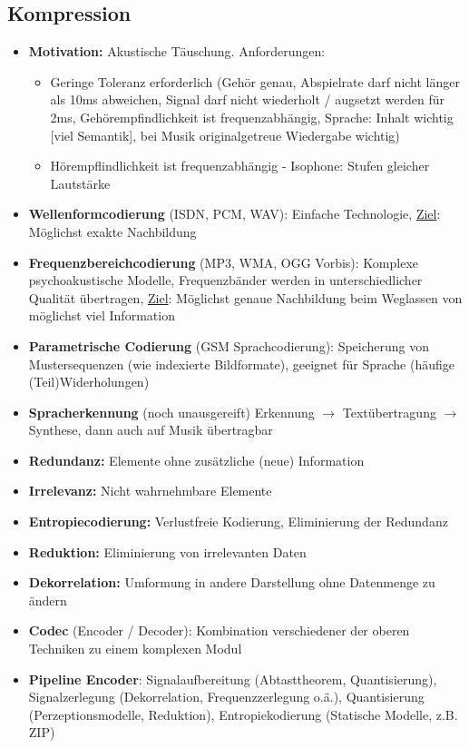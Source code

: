 \documentclass[12pt,landscape]{article}
\begin{document}
\begin{multicols}{3}
\subsection{Kompression}
\begin{itemize}
\item \textbf{Motivation:} Akustische Täuschung. Anforderungen:
\begin{itemize}
\item Geringe Toleranz erforderlich (Gehör genau, Abspielrate darf nicht länger als 10ms abweichen, Signal darf nicht wiederholt / augsetzt werden für 2ms, Gehörempfindlichkeit ist frequenzabhängig, Sprache: Inhalt wichtig [viel Semantik], bei Musik originalgetreue Wiedergabe wichtig)
\item Hörempflindlichkeit ist frequenzabhängig - Isophone: Stufen gleicher Lautstärke
\end{itemize}
\item \textbf{Wellenformcodierung} (ISDN, PCM, WAV): Einfache Technologie, \underline{Ziel}: Möglichst exakte Nachbildung
\item \textbf{Frequenzbereichcodierung} (MP3, WMA, OGG Vorbis): Komplexe psychoakustische Modelle, Frequenzbänder werden in unterschiedlicher Qualität übertragen, \underline{Ziel}: Möglichst genaue Nachbildung beim Weglassen von möglichst viel Information
\item \textbf{Parametrische Codierung} (GSM Sprachcodierung): Speicherung von Mustersequenzen (wie indexierte Bildformate), geeignet für Sprache (häufige (Teil)Widerholungen)
\item \textbf{Spracherkennung} (noch unausgereift) Erkennung $\rightarrow$ Textübertragung $\rightarrow$ Synthese, dann auch auf Musik übertragbar
\item \textbf{Redundanz:} Elemente ohne zusätzliche (neue) Information
\item \textbf{Irrelevanz:} Nicht wahrnehmbare Elemente
\item \textbf{Entropiecodierung:} Verlustfreie Kodierung, Eliminierung der Redundanz
\item \textbf{Reduktion:} Eliminierung von irrelevanten Daten
\item \textbf{Dekorrelation:} Umformung in andere Darstellung ohne Datenmenge zu ändern
\item \textbf{Codec} (Encoder / Decoder): Kombination verschiedener der oberen Techniken zu einem komplexen Modul
\item \textbf{Pipeline Encoder}: Signalaufbereitung (Abtasttheorem, Quantisierung), Signalzerlegung (Dekorrelation, Frequenzzerlegung o.ä.), Quantisierung (Perzeptionsmodelle, Reduktion), Entropiekodierung (Statische Modelle, z.B. ZIP)

\end{itemize}
\end{multicols}
\end{document}
